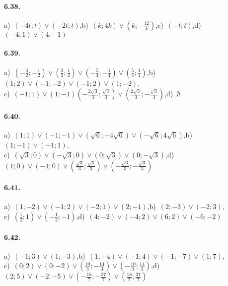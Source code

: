 \paragraph{6.38.} a)~\((-4t;t)\vee(-2t;t)\),\quad b)~\((k;4k)\vee(k;-\frac{1 2}k)\),\quad c)~\((-t;t)\),\quad d)~\((-4;1)\vee(4;-1)\)

\paragraph{6.39.} a)~\(\left(-\frac 3 2;-\frac 1 2\right)\vee\left(\frac 3 2;\frac 1 2\right)\vee\left(-\frac 5 4;-\frac 1 4\right)\vee\left(\frac 5 4;\frac 1 4\right)\),\quad b)~\((1;2)\vee(-1;-2)\vee (-1;2)\vee (1;-2)\),\protect\\
\quad c)~\((-1;1)\vee (1;-1)\left(-\frac{2\sqrt 3} 3;\frac{\sqrt 3} 3\right)\vee\left(\frac{2\sqrt 3} 3;-\frac{\sqrt 3} 3\right)\),\quad d)~\(\emptyset\)

\paragraph{6.40.} a)~\((1;1)\vee(-1;-1)\vee\left(\sqrt 6;-4\sqrt 6\right)\vee\left(-\sqrt 6;4\sqrt 6\right)\),\quad b)~\((1;-1)\vee(-1;1)\),\protect\\
\quad c)~\((\sqrt 3;0)\vee (-\sqrt 3;0)\vee (0;\sqrt 3)\vee (0;-\sqrt 3)\),\quad d)~\((1;0)\vee (-1;0)\vee\left(\frac{\sqrt 3} 3;\frac{\sqrt 3} 3\right)\vee\left(-\frac{\sqrt 3} 3;-\frac{\sqrt 3} 3\right)\)

\paragraph{6.41.} a)~\((1;-2)\vee(-1;2)\vee (-2;1)\vee (2;-1)\),\quad b)~\((2;-3)\vee(-2;3)\),\protect\\
\quad c)~\(\left(\frac 1 2;1\right)\vee \left(-\frac 1 2;-1\right)\),\quad d)~\((4;-2)\vee(-4;2)\vee (6;2)\vee (-6;-2)\)

\paragraph{6.42.} a)~\((-1;3)\vee(1;-3)\),\quad b)~\((1;-4)\vee(-1;4)\vee (-1;-7)\vee (1;7)\),\protect\\
\quad c)~\((0;2)\vee (0;-2)\vee \left(\frac{10} 3;-\frac{14} 3\right)\vee \left(-\frac{10} 3;\frac{14} 3\right)\),\quad d)~\((2;5)\vee (-2;-5)\vee \left(-\frac{18} 7;-\frac{37} 7\right)\vee \left(\frac{18} 7;\frac{37} 7\right)\)


